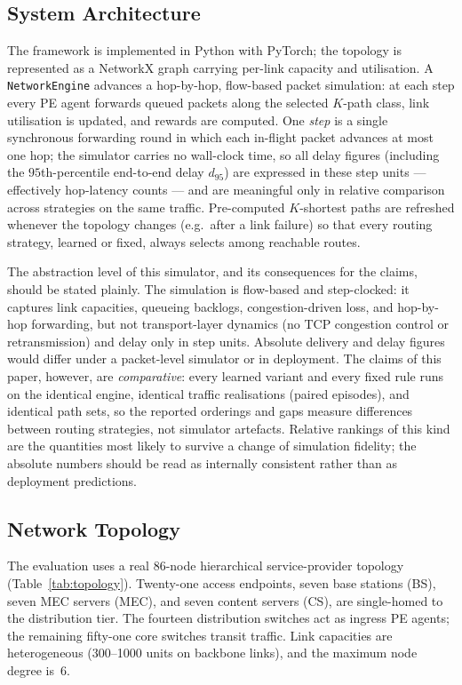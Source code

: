 \documentclass[10pt,journal,comsoc]{IEEEtran}
\begin{document}
\subsection{System Architecture}
The framework is implemented in Python with PyTorch; the topology is represented as a NetworkX graph carrying per-link capacity and utilisation. A \texttt{NetworkEngine} advances a hop-by-hop, flow-based packet simulation: at each step every PE agent forwards queued packets along the selected $K$-path class, link utilisation is updated, and rewards are computed. One \emph{step} is a single synchronous forwarding round in which each in-flight packet advances at most one hop; the simulator carries no wall-clock time, so all delay figures (including the $95$th-percentile end-to-end delay $d_{95}$) are expressed in these step units --- effectively hop-latency counts --- and are meaningful only in relative comparison across strategies on the same traffic. Pre-computed $K$-shortest paths are refreshed whenever the topology changes (e.g.\ after a link failure) so that every routing strategy, learned or fixed, always selects among reachable routes.

The abstraction level of this simulator, and its consequences for the claims, should be stated plainly. The simulation is flow-based and step-clocked: it captures link capacities, queueing backlogs, congestion-driven loss, and hop-by-hop forwarding, but not transport-layer dynamics (no TCP congestion control or retransmission) and delay only in step units. Absolute delivery and delay figures would differ under a packet-level simulator or in deployment. The claims of this paper, however, are \emph{comparative}: every learned variant and every fixed rule runs on the identical engine, identical traffic realisations (paired episodes), and identical path sets, so the reported orderings and gaps measure differences between routing strategies, not simulator artefacts. Relative rankings of this kind are the quantities most likely to survive a change of simulation fidelity; the absolute numbers should be read as internally consistent rather than as deployment predictions.

\subsection{Network Topology}
The evaluation uses a real 86-node hierarchical service-provider topology (Table~\ref{tab:topology}). Twenty-one access endpoints, seven base stations (BS), seven MEC servers (MEC), and seven content servers (CS), are single-homed to the distribution tier. The fourteen distribution switches act as ingress PE agents; the remaining fifty-one core switches transit traffic. Link capacities are heterogeneous (300--1000 units on backbone links), and the maximum node degree is~6.
\end{document}
